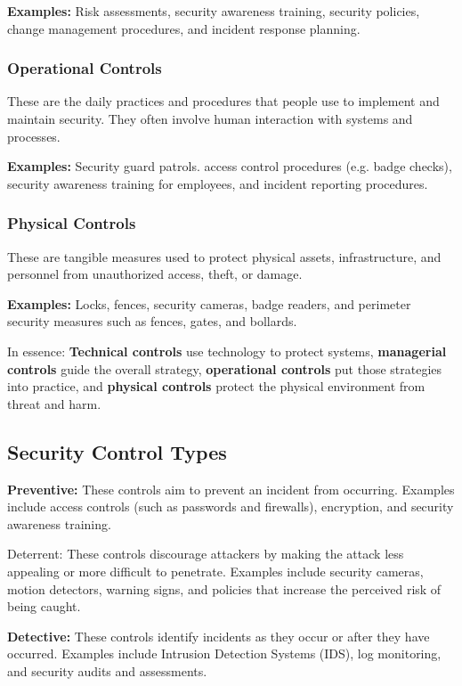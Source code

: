 \textbf{Examples:} Risk assessments, security awareness training, security policies, change management procedures, and incident response planning.

\subsubsection{Operational Controls}
These are the daily practices and procedures that people use to implement and maintain security. They often involve human interaction with systems and processes.

\textbf{Examples:} Security guard patrols. access control procedures (e.g. badge checks), security awareness training for employees, and incident reporting procedures.

\subsubsection{Physical Controls}
These are tangible measures used to protect physical assets, infrastructure, and personnel from unauthorized access, theft, or damage.

\textbf{Examples:} Locks, fences, security cameras, badge readers, and perimeter security measures such as fences, gates, and bollards.

In essence: \textbf{Technical controls} use technology to protect systems, \textbf{managerial controls} guide the overall strategy, \textbf{operational controls} put those strategies into practice, and \textbf{physical controls} protect the physical environment from threat and harm.

\subsection{Security Control Types}

\textbf{Preventive:} These controls aim to prevent an incident from occurring. Examples include access controls (such as passwords and firewalls), encryption, and security awareness training.

Deterrent: These controls discourage attackers by making the attack less appealing or more difficult to penetrate. Examples include security cameras, motion detectors, warning signs, and policies that increase the perceived risk of being caught.

\textbf{Detective:} These controls identify incidents as they occur or after they have occurred. Examples include Intrusion Detection Systems (IDS), log monitoring, and security audits and assessments.

